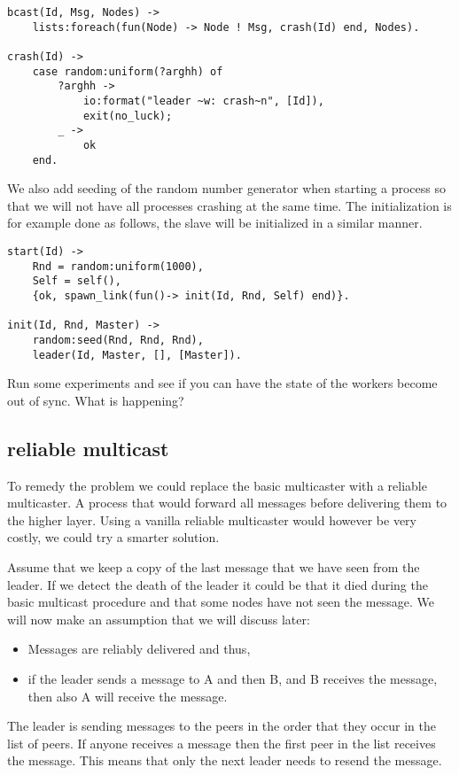 \documentclass[a4paper,11pt]{article}
\begin{document}
\begin{verbatim}
bcast(Id, Msg, Nodes) ->
    lists:foreach(fun(Node) -> Node ! Msg, crash(Id) end, Nodes).

crash(Id) ->
    case random:uniform(?arghh) of
        ?arghh ->
            io:format("leader ~w: crash~n", [Id]),
            exit(no_luck);
        _ ->
            ok
    end.
\end{verbatim}

We also add seeding of the random number generator when starting a
process so that we will not have all processes crashing at the same
time. The initialization is for example done as follows, the slave
will be initialized in a similar manner. 

\begin{verbatim}
start(Id) ->
    Rnd = random:uniform(1000),
    Self = self(),
    {ok, spawn_link(fun()-> init(Id, Rnd, Self) end)}.

init(Id, Rnd, Master) ->
    random:seed(Rnd, Rnd, Rnd),
    leader(Id, Master, [], [Master]).
\end{verbatim}

Run some experiments and see if you can have the state of the workers
become out of sync. What is happening?

\subsection{reliable multicast}

To remedy the problem we could replace the basic multicaster with a
reliable multicaster. A process that would forward all messages before
delivering them to the higher layer. Using a vanilla reliable
multicaster would however be very costly, we could try a smarter
solution.

Assume that we keep a copy of the last message that we have seen from
the leader. If we detect the death of the leader it could be that it
died during the basic multicast procedure and that some nodes have not
seen the message. We will now make an assumption that we will discuss later:

\begin{itemize}
\item Messages are reliably delivered and thus,
\item if the leader sends a message to A and then B, and B receives the
  message, then also A will receive the message.
\end{itemize}

The leader is sending messages to the peers in the order that they
occur in the list of peers. If anyone receives a message then the
first peer in the list receives the message. This means that only the
next leader needs to resend the message.
\end{document}
